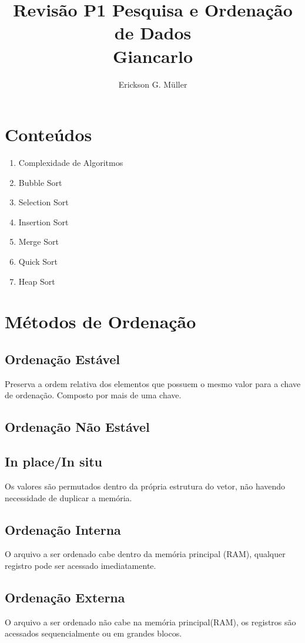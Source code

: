 \documentclass[•]{article}
\title{Revisão P1 Pesquisa e Ordenação de Dados\\Giancarlo}
\author{Erickson G. Müller}
\begin{document}
	\maketitle
	\section{Conteúdos}
		\begin{enumerate}
			\item Complexidade de Algoritmos
			\item Bubble Sort
			\item Selection Sort
			\item Insertion Sort
			\item Merge Sort
			\item Quick Sort
			\item Heap Sort
		\end{enumerate}
	\newpage
	\section{Métodos de Ordenação}
		\subsection{Ordenação Estável}
			Preserva a ordem relativa dos elementos que possuem o mesmo valor para a chave de ordenação. Composto por mais de uma chave.
		\subsection{Ordenação Não Estável}
		\subsection{In place/In situ}
			Os valores são permutados dentro da própria estrutura do vetor, não havendo necessidade de duplicar a memória.
		\subsection{Ordenação Interna}
			O arquivo a ser ordenado cabe dentro da memória principal (RAM), qualquer registro pode ser acessado imediatamente.
		\subsection{Ordenação Externa}
			O arquivo a ser ordenado não cabe na memória principal(RAM), os registros são acessados sequencialmente ou em grandes blocos.
\end{document}
